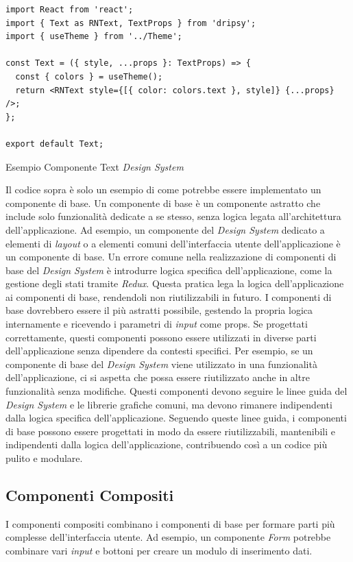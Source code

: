 \begin{listing}[H]
    \begin{verbatim}
import React from 'react';
import { Text as RNText, TextProps } from 'dripsy';
import { useTheme } from '../Theme';

const Text = ({ style, ...props }: TextProps) => {
  const { colors } = useTheme();
  return <RNText style={[{ color: colors.text }, style]} {...props} />;
};

export default Text;
    \end{verbatim}
    \caption{Esempio Componente Text \textit{Design System}}
    \label{listing_text_design_system}
\end{listing}
Il codice sopra è solo un esempio di come potrebbe essere implementato un componente di base.
Un componente di base è un componente astratto che include solo funzionalità dedicate a se stesso,
senza logica legata all'architettura dell'applicazione.
Ad esempio, un componente del \textit{Design System} dedicato a elementi di \textit{layout} o a elementi comuni dell'interfaccia utente dell'applicazione è un componente di base.
Un errore comune nella realizzazione di componenti di base del \textit{Design System} è introdurre logica specifica dell'applicazione, 
come la gestione degli stati tramite \textit{Redux}.
Questa pratica lega la logica dell'applicazione ai componenti di base, rendendoli non riutilizzabili in futuro.
I componenti di base dovrebbero essere il più astratti possibile, gestendo la propria logica internamente e ricevendo i parametri di \textit{input} come props.
Se progettati correttamente, questi componenti possono essere utilizzati in diverse parti dell'applicazione senza dipendere da contesti specifici.
Per esempio, se un componente di base del \textit{Design System} viene utilizzato in una funzionalità dell'applicazione, ci si aspetta che possa essere riutilizzato anche in altre funzionalità senza modifiche.
Questi componenti devono seguire le linee guida del \textit{Design System} e le librerie grafiche comuni, ma devono rimanere indipendenti dalla logica specifica dell'applicazione.
Seguendo queste linee guida, i componenti di base possono essere progettati in modo da essere riutilizzabili, mantenibili e indipendenti dalla logica dell'applicazione, contribuendo così a un codice più pulito e modulare.

\subsection{Componenti Compositi}
I componenti compositi combinano i componenti di base per formare parti più complesse dell'interfaccia utente.
Ad esempio, un componente \textit{Form} potrebbe combinare vari \textit{input} e bottoni per creare un modulo di inserimento dati.

